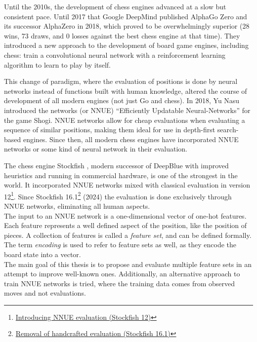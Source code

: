 Until the 2010s, the development of chess engines advanced at a slow but consistent pace. Until 2017 that Google DeepMind published AlphaGo Zero \cite{alphagozero:2017} and its successor AlphaZero \cite{alphazero:2017,alphazero:2018} in 2018, which proved to be overwhelmingly superior (28 wins, 73 draws, and 0 losses against the best chess engine at that time). They introduced a new approach to the development of board game engines, including chess: train a convolutional neural network with a reinforcement learning algorithm to learn to play by itself.

This change of paradigm, where the evaluation of positions is done by neural networks instead of functions built with human knowledge, altered the course of development of all modern engines (not just Go and chess). In 2018, Yu Nasu introduced the networks  (or NNUE) ``Efficiently Updatable Neural-Networks'' \cite{nnue:2018} for the game Shogi. NNUE networks allow for cheap evaluations when evaluating a sequence of similar positions, making them ideal for use in depth-first search-based engines. Since then, all modern chess engines have incorporated NNUE networks or some kind of neural network in their evaluation.

The chess engine Stockfish \cite{stockfish}, modern successor of DeepBlue with improved heuristics and running in commercial hardware, is one of the strongest in the world. It incorporated NNUE networks mixed with classical evaluation in version 12\footnote[1]{\href{https://stockfishchess.org/blog/2020/introducing-nnue-evaluation/}{Introducing NNUE evaluation (Stockfish 12)}}. Since Stockfish 16.1\footnote[2]{\href{https://stockfishchess.org/blog/2024/stockfish-16-1/}{Removal of handcrafted evaluation (Stockfish 16.1)}} (2024) the evaluation is done exclusively through NNUE networks, eliminating all human aspects. \\

The input to an NNUE network is a one-dimensional vector of one-hot features. Each feature represents a well defined aspect of the position, like the position of pieces. A collection of features is called a \textit{feature set}, and can be defined formally. The term \textit{encoding} is used to refer to feature sets as well, as they encode the board state into a vector. \\

The main goal of this thesis is to propose and evaluate multiple feature sets in an attempt to improve well-known ones. Additionally, an alternative approach to train NNUE networks is tried, where the training data comes from observed moves and not evaluations.

